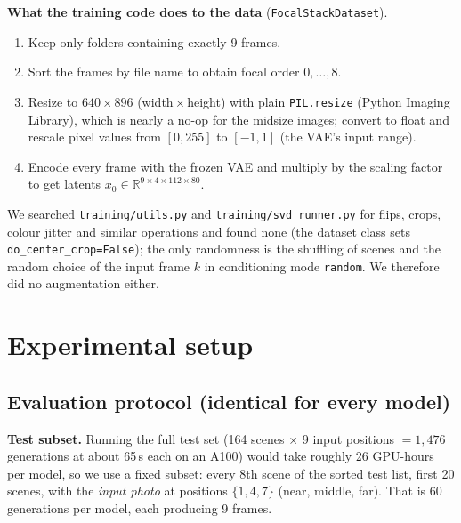 \documentclass[11pt]{article}
\begin{document}
\textbf{What the training code does to the data} (\texttt{FocalStackDataset}).
\begin{enumerate}[noitemsep]
  \item Keep only folders containing exactly 9 frames.
  \item Sort the frames by file name to obtain focal order $0,\dots,8$.
  \item Resize to $640\times896$ (width\,$\times$\,height) with plain \texttt{PIL.resize} (Python Imaging Library), which is nearly a no-op for the midsize images; convert to float and rescale pixel values from $[0,255]$ to $[-1,1]$ (the VAE's input range).
  \item Encode every frame with the frozen VAE and multiply by the scaling factor to get latents $x_0\in\mathbb{R}^{9\times4\times112\times80}$.
\end{enumerate}
We searched \texttt{training/utils.py} and \texttt{training/svd\_runner.py} for flips, crops, colour jitter and similar operations and found none (the dataset class sets \texttt{do\_center\_crop=False}); the only randomness is the shuffling of scenes and the random choice of the input frame $k$ in conditioning mode \texttt{random}. We therefore did no augmentation either.

\section{Experimental setup}\label{sec:setup}
\subsection{Evaluation protocol (identical for every model)}\label{sec:protocol}
\textbf{Test subset.} Running the full test set (164 scenes $\times$ 9 input positions $=1{,}476$ generations at about 65\,s each on an A100) would take roughly 26 GPU-hours per model, so we use a fixed subset: every 8th scene of the sorted test list, first 20 scenes, with the \emph{input photo} at positions $\{1,4,7\}$ (near, middle, far). That is 60 generations per model, each producing 9 frames.
\end{document}
